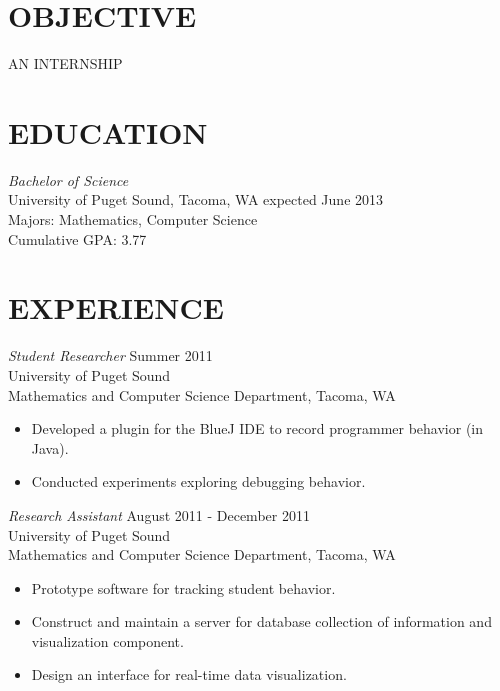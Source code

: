 \documentclass[line,margin,11pt]{res}
\begin{document}


\address{1311 N. Alder, Tacoma, WA 98406}
\address{(406) 546-9210, kwenholz@pugetsound.edu}

 
\begin{resume}
\vspace*{.55cm}
\section{OBJECTIVE} AN INTERNSHIP
 
\section{EDUCATION} {\sl Bachelor of Science} \\
                University of Puget Sound, Tacoma, WA 
                expected June 2013 \\
                Majors: Mathematics, Computer Science \\
                Cumulative GPA: 3.77

\vspace*{.5cm}

 
\section{EXPERIENCE} 

{\sl Student Researcher} \hfill            
Summer 2011 \\
University of Puget Sound\\
Mathematics and Computer Science Department,
Tacoma, WA
\begin{itemize}  
    \item Developed a plugin for the BlueJ IDE to record 
      programmer behavior (in Java).
    \item Conducted experiments exploring debugging behavior.
\end{itemize} 

{\sl Research Assistant} \hfill
August 2011 - December 2011 \\
University of Puget Sound\\
Mathematics and Computer Science Department,
Tacoma, WA
\begin{itemize}
    \item Prototype software for tracking student behavior.
    \item Construct and maintain a server for database collection of 
      information and visualization component.
    \item Design an interface for real-time data visualization.
\end{itemize}
                   

\end{resume}
\end{document}
